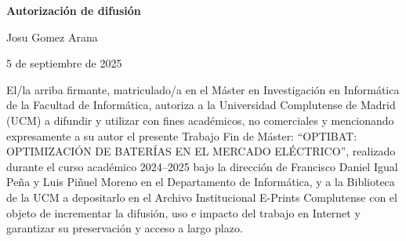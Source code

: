\newpage

\thispagestyle{empty}

\begin{center}

  {\bf \Huge Autorización de difusión}

  \vspace{1cm}

  \large Josu Gomez Arana

  \vspace{0.5cm}

  5 de septiembre de 2025

  \vspace{0.5cm}

\end{center}

El/la arriba firmante, matriculado/a en el Máster en Investigación en Informática de la Facultad de Informática, autoriza a la Universidad Complutense de Madrid (UCM) a difundir y utilizar con fines académicos, no comerciales y mencionando expresamente a su autor el presente Trabajo Fin de Máster: “OPTIBAT\@: OPTIMIZACIÓN DE BATERÍAS EN EL MERCADO ELÉCTRICO”, realizado durante el curso académico 2024--2025 bajo la dirección de Francisco Daniel Igual Peña y Luis Piñuel Moreno en el Departamento de Informática, y a la Biblioteca de la UCM a depositarlo en el Archivo Institucional E-Prints Complutense con el objeto de incrementar la difusión, uso e impacto del trabajo en Internet y garantizar su preservación y acceso a largo plazo.
